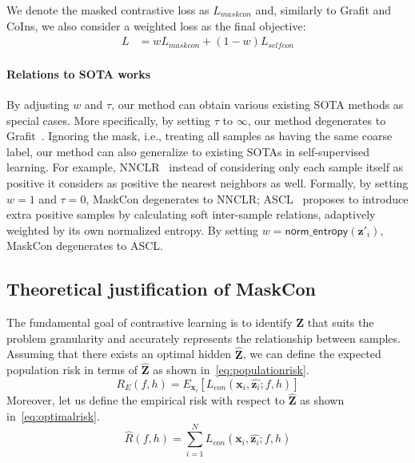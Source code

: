 \documentclass[10pt,twocolumn,letterpaper]{article}
\def\vx{{\bm{x}}}
\def\vz{{\bm{z}}}
\def\mZ{{\bm{Z}}}
\begin{document}
We denote the masked contrastive loss as $L_{maskcon}$ and, similarly to Grafit and CoIns, we also consider a weighted loss as the final objective:
\begin{align}
    L &= wL_{maskcon} + (1-w)L_{selfcon}
\end{align}


\paragraph{Relations to SOTA works}\label{method:relation_to_otherworks}
By adjusting $w$ and $\tau$, our method can obtain various existing SOTA methods as special cases. More specifically, by setting $\tau$ to $\infty$, our method degenerates to Grafit~\cite{touvron2021grafit}. Ignoring the mask, i.e., treating all samples as having the same coarse label,
our method can also generalize to existing SOTAs in self-supervised learning. For example, NNCLR~\cite{dwibedi2021nnclr} instead of considering only each sample itself as positive it considers as positive the nearest neighbors as well. Formally, by setting $w = 1$ and $\tau = 0$, MaskCon degenerates to NNCLR; ASCL~\cite{ascl} proposes to introduce extra positive samples by calculating soft inter-sample relations, adaptively weighted by its own normalized entropy. By setting $w=\mathsf{norm\_entropy}(\vz'_i)$, MaskCon degenerates to ASCL. 

\subsection{Theoretical justification of MaskCon}
The fundamental goal of contrastive learning is to identify $\mZ$ that suits the problem granularity and accurately represents the relationship between samples. Assuming that there exists an optimal hidden $\hat{\mZ}$, we can define the expected population risk in terms of $\hat{\mZ}$ as shown in~\cref{eq:populationrisk}. 
\begin{equation}\label{eq:populationrisk}
    R_E(f, h) = E_{\vx_i} [L_{con}(\vx_i, \hat{\vz_i}; f, h)]
\end{equation}
Moreover, let us define the empirical risk with respect to $\hat{\mZ}$ as shown in~\cref{eq:optimalrisk}.
\begin{equation}\label{eq:optimalrisk}
      \hat{R}(f, h) = \sum_{i=1}^N L_{con}(\vx_i, \hat{\vz_i}; f, h)
\end{equation}
\end{document}
